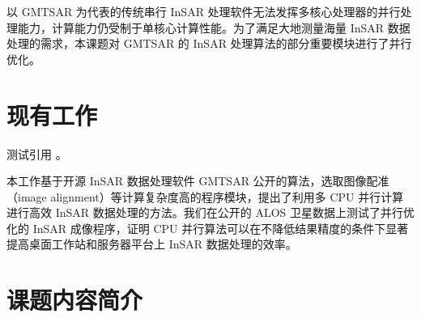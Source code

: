 以 GMTSAR 为代表的传统串行 InSAR 处理软件无法发挥多核心处理器的并行处理能力，计算能力仍受制于单核心计算性能。为了满足大地测量海量 InSAR 数据处理的需求，本课题对 GMTSAR 的 InSAR 处理算法的部分重要模块进行了并行优化。

\section{现有工作}

测试引用 \cite{shayu2014}。

本工作基于开源 InSAR 数据处理软件 GMTSAR 公开的算法，选取图像配准（image alignment）等计算复杂度高的程序模块，提出了利用多 CPU 并行计算进行高效 InSAR 数据处理的方法。我们在公开的 ALOS 卫星数据上测试了并行优化的 InSAR 成像程序，证明 CPU 并行算法可以在不降低结果精度的条件下显著提高桌面工作站和服务器平台上 InSAR 数据处理的效率。

\section{课题内容简介}


